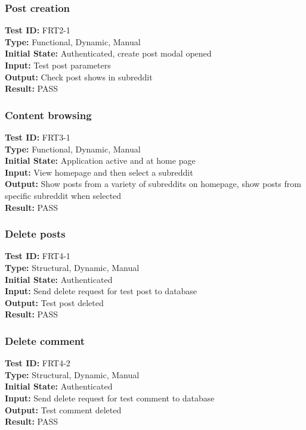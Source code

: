 \documentclass[12pt,fleqn]{article}
\begin{document}
\subsubsection{Post creation}
\textbf{Test ID:} FRT2-1\\
\textbf{Type:} Functional, Dynamic, Manual\\
\textbf{Initial State:} Authenticated, create post modal opened\\
\textbf{Input:} Test post parameters\\
\textbf{Output:} Check post shows in subreddit\\
\textbf{Result:} PASS

\subsubsection{Content browsing}
\textbf{Test ID:} FRT3-1\\
\textbf{Type:} Functional, Dynamic, Manual\\
\textbf{Initial State:} Application active and at home page\\
\textbf{Input:} View homepage and then select a subreddit\\
\textbf{Output:} Show posts from a variety of subreddits on homepage, show posts from specific subreddit when selected\\
\textbf{Result:} PASS

\subsubsection{Delete posts}
\textbf{Test ID:} FRT4-1\\
\textbf{Type:} Structural, Dynamic, Manual\\
\textbf{Initial State:} Authenticated\\
\textbf{Input:} Send delete request for test post to database\\
\textbf{Output:} Test post deleted\\
\textbf{Result:} PASS

\subsubsection{Delete comment}
\textbf{Test ID:} FRT4-2\\
\textbf{Type:} Structural, Dynamic, Manual\\
\textbf{Initial State:} Authenticated\\
\textbf{Input:} Send delete request for test comment to database\\
\textbf{Output:} Test comment deleted\\
\textbf{Result:} PASS
\end{document}
